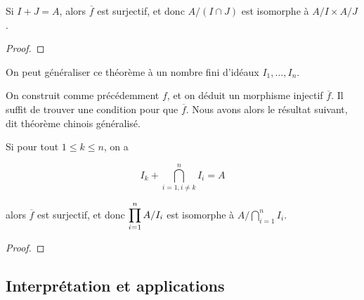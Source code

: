 \begin{theorem}
	Si $I + J = A$, alors $\overline{f}$ est surjectif, et donc $A/(I \cap
	J)$ est isomorphe à $A/I \times A/J$.
\end{theorem}

\ifdefined\outputproof
\begin{proof}

\end{proof}
\fi

On peut généraliser ce théorème à un nombre fini d'idéaux $I_{1}, \ldots,
I_{n}$.

On construit comme précédemment $f$, et on déduit un morphisme injectif
$\overline{f}$. Il suffit de trouver une condition pour que $\overline{f}$. Nous
avons alors le résultat suivant, dit théorème chinois généralisé.

\begin{theorem}
	Si pour tout $1 \leq k \leq n$, on a

	\begin{equation}
		I_{k} + \displaystyle \bigcap_{{i = 1, i \neq k}}^{n} I_{i} = A
	\end{equation}

	alors $\overline{f}$ est surjectif, et
	donc $\displaystyle \prod_{i = 1}^{n} A/I_{i}$ est isomorphe à $\displaystyle A/\bigcap_{i = 1}^{n}
	I_{i}$.
\end{theorem}

\ifdefined\outputproof
\begin{proof}

\end{proof}
\fi

\subsection{Interprétation et applications}

